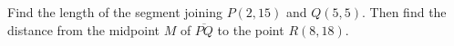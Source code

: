 Find the length of the segment joining $P(2,15)$ and $Q(5,5)$. Then find the distance from the midpoint $M$ of $\overline{PQ}$ to the point $R(8,18)$.
